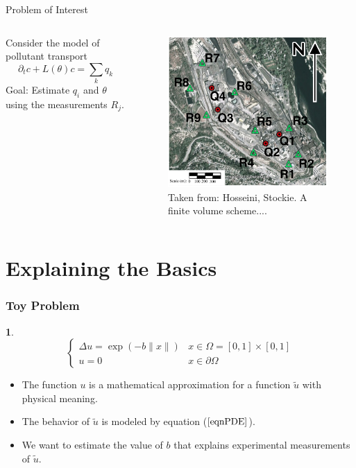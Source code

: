 \documentclass[11pt]{beamer}
\theoremstyle{plain}
\theoremstyle{definition}
\newtheorem{dfn}{}[section]
\newcommand\ChangeFont{\fontsize{9}{7.2}\selectfont}
\begin{document}
\begin{frame}{Problem of Interest}

\begin{columns}[c]
\column{1.5in}
Consider the model of pollutant transport
\begin{equation*}
\partial_{t} c+L(\theta)c=\sum_{k}q_{k}
\end{equation*}
Goal: Estimate $q_{i}$ and $\theta$ using the measurements $R_{j}$.
\column{1.5in}
\begin{figure}
\includegraphics[scale=0.36]{BCtrail}
\ChangeFont
\caption{Taken from: Hosseini, Stockie. A finite volume scheme....}
\end{figure}

\end{columns}
\end{frame}

\section{Explaining the Basics}

\begin{frame}
\frametitle{Toy Problem}
\begin{dfn}
\begin{equation}\label{eqnPDE}
\left\{
        \begin{array}{ll}
                \Delta u=\exp(-b\|x\|) & x\in \Omega=[0,1]\times [0,1] \\
                u=0 & x\in\partial\Omega
        \end{array}
\right.
\end{equation}
\end{dfn}
\begin{itemize}
\item The function $u$ is a mathematical approximation for a function 
$\tilde{u}$ with physical meaning. 
\item The behavior of $\tilde{u}$ is modeled by equation ($\ref{eqnPDE}$).
\item We want to estimate the value of $b$ that explains experimental
measurements of $\tilde{u}$.
\end{itemize}
\end{frame}
\end{document}
